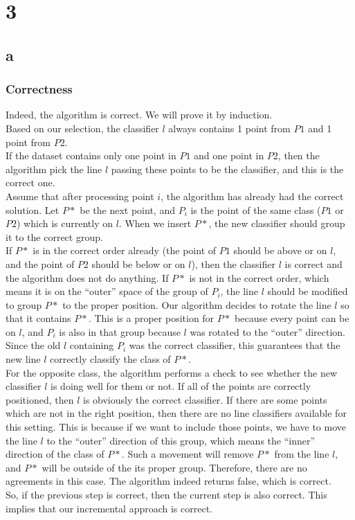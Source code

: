 
\section*{3}
\subsection*{a}

\subsubsection*{Correctness}
Indeed, the algorithm is correct. We will prove it by induction. \\ 

Based on our selection, the classifier $l$ always contains 1 point from $P1$ and 1 point from $P2$. \\

If the dataset contains only one point in $P1$ and one point in $P2$, then the algorithm pick the line $l$ passing these points to be the classifier, and this is the correct one. \\

Assume that after processing point $i$, the algorithm has already had the correct solution. Let $P*$ be the next point, and $P_i$ is the point of the same class ($P1$ or $P2$) which is 
currently on $l$.  When we insert $P*$, the new classifier should group it to the correct group. \\

If $P*$ is in the correct order already (the point of $P1$ should be above or on $l$, and the point of $P2$ should be below or on $l$), then the classifier $l$ is correct and
the algorithm does not do anything. If $P*$ is not in the correct order, which means it is on the ``outer'' space of the group of $P_i$, the line $l$ should be modified to group $P*$ to the proper position. Our algorithm decides to rotate the line $l$ so that it contains $P*$. This is a proper position for $P*$ because every point can be on $l$, and $P_i$ is also in that group because $l$ was rotated to the ``outer'' direction. Since the old $l$ containing $P_i$ was the correct classifier, this guarantees that the new line $l$ correctly classify the class of $P*$. \\ 

For the opposite class, the algorithm performs a check to see whether the new classifier $l$ is doing well for them or not. If all of the points are correctly positioned, then $l$ is obviously the correct classifier. If there are some points which are not in the right position, then there are no line classifiers available for this setting. This is because if we want to include those points, we have to move the line $l$ to the ``outer'' direction of this group, which means the ``inner'' direction of the class of $P*$. Such a movement will remove $P*$ from the line $l$, and $P*$ will be outside of the its proper group. Therefore, there are no agreements in this case. The algorithm indeed returns false, which is correct. \\

So, if the previous step is correct, then the current step is also correct. This implies that our incremental approach is correct. \\
